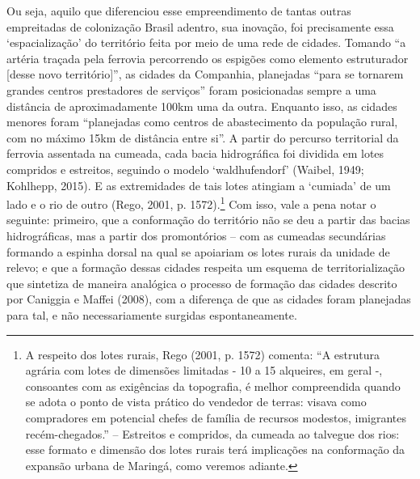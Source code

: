 \documentclass[12pt, a4paper]{book} %
\begin{document}
        Ou seja, aquilo que diferenciou esse empreendimento de tantas outras empreitadas de colonização Brasil adentro, sua inovação, foi precisamente essa `espacialização' do território feita por meio de uma rede de cidades. Tomando ``a artéria traçada pela ferrovia percorrendo os espigões como elemento estruturador [desse novo território]'', as cidades da Companhia, planejadas ``para se tornarem grandes centros prestadores de serviços'' foram posicionadas sempre a uma distância de aproximadamente 100km uma da outra. Enquanto isso, as cidades menores foram ``planejadas como centros de abastecimento da população rural, com no máximo 15km de distância entre si''. A partir do percurso territorial da ferrovia assentada na cumeada, cada bacia hidrográfica foi dividida em lotes compridos e estreitos, seguindo o modelo `waldhufendorf' (Waibel, 1949; Kohlhepp, 2015). E as extremidades de tais lotes atingiam a `cumiada' de um lado e o rio de outro (Rego, 2001, p. 1572).\footnote[15]{ A respeito dos lotes rurais, Rego (2001, p. 1572) comenta: ``A estrutura agrária com lotes de dimensões limitadas - 10 a 15 alqueires, em geral -, consoantes com as exigências da topografia, é melhor compreendida quando se adota o ponto de vista prático do vendedor de terras: visava como compradores em potencial chefes de família de recursos modestos, imigrantes recém-chegados.'' – Estreitos e compridos, da cumeada ao talvegue dos rios: esse formato e dimensão dos lotes rurais terá implicações na conformação da expansão urbana de Maringá, como veremos adiante.} Com isso, vale a pena notar o seguinte: primeiro, que a conformação do território não se deu a partir das bacias hidrográficas, mas a partir dos promontórios – com as cumeadas secundárias formando a espinha dorsal na qual se apoiariam os lotes rurais da unidade de relevo; e que a formação dessas cidades respeita um esquema de territorialização que sintetiza de maneira analógica o processo de formação das cidades descrito por Caniggia e Maffei (2008), com a diferença de que as cidades foram planejadas para tal, e não necessariamente surgidas espontaneamente.
\end{document}
